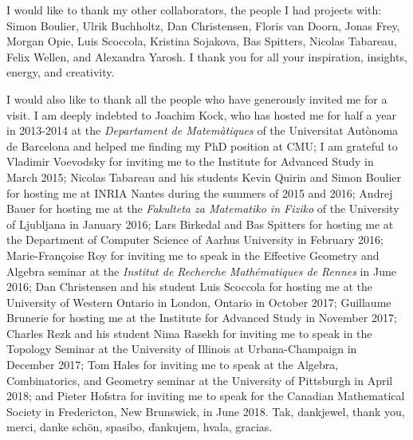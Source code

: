 I would like to thank my other collaborators, the people I had projects with:
Simon Boulier, Ulrik Buchholtz, Dan Christensen, Floris van Doorn, Jonas Frey, Morgan Opie, Luis Scoccola, Kristina Sojakova, Bas Spitters, Nicolas Tabareau, Felix Wellen, and Alexandra Yarosh. I thank you for all your inspiration, insights, energy, and creativity.

I would also like to thank all the people who have generously invited me for a visit. I am deeply indebted to Joachim Kock, who has hosted me for half a year in 2013-2014 at the \textit{Departament de Matemàtiques} of the Universitat Autònoma de Barcelona and helped me finding my PhD position at CMU; I am grateful to Vladimir Voevodsky for inviting me to the Institute for Advanced Study in March 2015; Nicolas Tabareau and his students Kevin Quirin and Simon Boulier for hosting me at INRIA Nantes during the summers of 2015 and 2016; Andrej Bauer for hosting me at the \textit{Fakulteta za Matematiko in Fiziko} of the University of Ljubljana in January 2016; Lars Birkedal and Bas Spitters for hosting me at the Department of Computer Science of Aarhus University in February 2016; Marie-Françoise Roy for inviting me to speak in the Effective Geometry and Algebra seminar at the \textit{Institut de Recherche Mathématiques de Rennes} in June 2016; Dan Christensen and his student Luis Scoccola for hosting me at the University of Western Ontario in London, Ontario in October 2017; Guillaume Brunerie for hosting me at the Institute for Advanced Study in November 2017; Charles Rezk and his student Nima Rasekh for inviting me to speak in the Topology Seminar at the University of Illinois at Urbana-Champaign in December 2017; Tom Hales for inviting me to speak at the Algebra, Combinatorics, and Geometry seminar at the University of Pittsburgh in April 2018; and Pieter Hofstra for inviting me to speak for the Canadian Mathematical Society in Fredericton, New Brunswick, in June 2018. Tak, dankjewel, thank you, merci, danke sch\"on, spasibo, \v dankujem, hvala, gracias.

